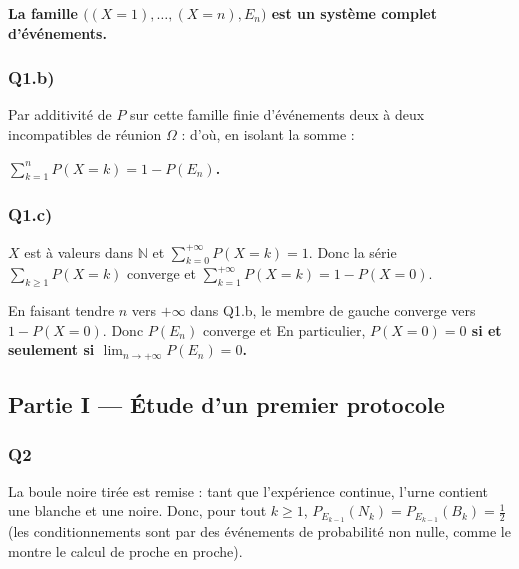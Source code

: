 \documentclass[11pt,a4paper]{article}
\newcommand{\equationajustee}[1]{%
  \sbox{\boiteequation}{$\displaystyle #1$}%
  \ifdim\wd\boiteequation>\linewidth
    \[\resizebox{\linewidth}{!}{\usebox{\boiteequation}}\]%
  \else
    \[#1\]%
  \fi}
\begin{document}
\textbf{La famille \(\big((X=1),\dots,(X=n),E_n\big)\) est un système complet d'événements.}

\hypertarget{q1.b}{%
\subsubsection{Q1.b)}\label{q1.b}}

Par additivité de \(P\) sur cette famille finie d'événements deux à deux incompatibles de réunion \(\Omega\) :
\equationajustee{\begin{aligned}
1&=P(\Omega)\\
&=\sum_{k=1}^{n}P(X=k)+P(E_n),
\end{aligned}}
d'où, en isolant la somme :

\textbf{\(\displaystyle\sum_{k=1}^{n}P(X=k)=1-P(E_n)\).}

\hypertarget{q1.c}{%
\subsubsection{Q1.c)}\label{q1.c}}

\(X\) est à valeurs dans \(\mathbb N\) et \(\sum_{k=0}^{+\infty}P(X=k)=1\). Donc la série \(\sum_{k\ge1}P(X=k)\) converge et \(\sum_{k=1}^{+\infty}P(X=k)=1-P(X=0)\).

En faisant tendre \(n\) vers \(+\infty\) dans Q1.b, le membre de gauche converge vers \(1-P(X=0)\). Donc \(P(E_n)\) converge et
\equationajustee{\boxed{\lim_{n\to+\infty}P(E_n)=P(X=0)}.}
En particulier, \textbf{\(P(X=0)=0\) si et seulement si \(\lim_{n\to+\infty}P(E_n)=0\).}

\hypertarget{partie-i-uxe9tude-dun-premier-protocole}{%
\subsection{Partie I --- Étude d'un premier protocole}\label{partie-i-uxe9tude-dun-premier-protocole}}

\hypertarget{q2}{%
\subsubsection{Q2}\label{q2}}

La boule noire tirée est remise : tant que l'expérience continue, l'urne contient une blanche et une noire. Donc, pour tout \(k\ge1\), \(P_{E_{k-1}}(N_k)=P_{E_{k-1}}(B_k)=\frac12\) (les conditionnements sont par des événements de probabilité non nulle, comme le montre le calcul de proche en proche).
\end{document}
